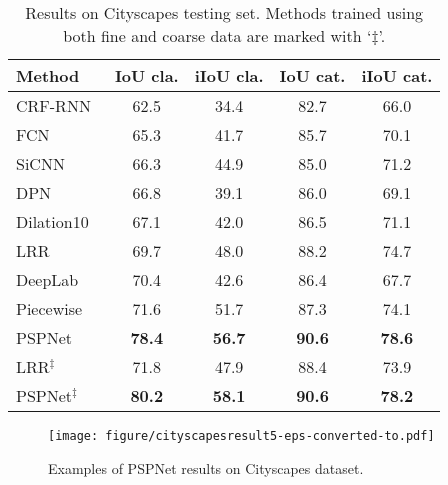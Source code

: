 \documentclass[10pt,twocolumn,letterpaper]{article}
\begin{document}
\begin{table}
    \footnotesize
    \begin{center}
        \begin{tabular}{ l | c c c c}
            \toprule[1pt]
            Method & IoU cla. & iIoU cla. & IoU cat. & iIoU cat. \\
            \hline\hline
            CRF-RNN~\cite{zheng2015conditional} & 62.5 & 34.4 & 82.7 & 66.0 \\
            FCN~\cite{long2015fully} & 65.3 & 41.7 & 85.7 & 70.1 \\
            SiCNN~~\cite{krevso2016convolutional} & 66.3 & 44.9 & 85.0 & 71.2 \\
            DPN~\cite{liu2015semantic} & 66.8 & 39.1 & 86.0 & 69.1 \\
            Dilation10~\cite{yu2015multi} & 67.1 & 42.0 & 86.5 & 71.1 \\
            LRR~\cite{ghiasi2016laplacian} & 69.7 & 48.0 & 88.2 & 74.7 \\
            DeepLab~\cite{chen2016deeplab} & 70.4 & 42.6 & 86.4 & 67.7 \\
            Piecewise~\cite{lin2015efficient} & 71.6 & 51.7 & 87.3 & 74.1 \\
            PSPNet & \textbf{78.4} & \textbf{56.7} & \textbf{90.6} & \textbf{78.6} \\
            \hline\hline
            LRR$^\ddag$~\cite{ghiasi2016laplacian} & 71.8 & 47.9 & 88.4 & 73.9 \\
            PSPNet$^\ddag$ & \textbf{80.2} & \textbf{58.1} & \textbf{90.6} & \textbf{78.2} \\
            \bottomrule[1pt]
        \end{tabular}
    \end{center}
    \caption{Results on Cityscapes testing set. Methods trained using both fine and
        coarse data are marked with `$\ddag$'.}
    \label{tab:cityscapescomprison}
\end{table}

\begin{figure}
\begin{center}
\texttt{[image: figure/cityscapesresult5-eps-converted-to.pdf]}
\end{center}
   \caption{Examples of PSPNet results on Cityscapes dataset.}
\label{fig:cityscapesresult}
\end{figure}
\end{document}
